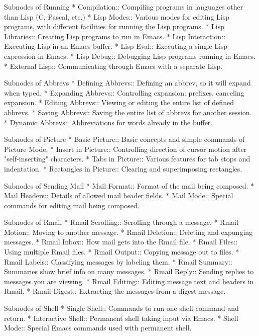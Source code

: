 Subnodes of Running
* Compilation::       Compiling programs in languages other than Lisp
                       (C, Pascal, etc.)
* Lisp Modes::        Various modes for editing Lisp programs, with
                       different facilities for running the Lisp programs.
* Lisp Libraries::    Creating Lisp programs to run in Emacs.
* Lisp Interaction::  Executing Lisp in an Emacs buffer.
* Lisp Eval::         Executing a single Lisp expression in Emacs.
* Lisp Debug::        Debugging Lisp programs running in Emacs.
* External Lisp::     Communicating through Emacs with a separate Lisp.

Subnodes of Abbrevs
* Defining Abbrevs::  Defining an abbrev, so it will expand when typed.
* Expanding Abbrevs:: Controlling expansion: prefixes, canceling expansion.
* Editing Abbrevs::   Viewing or editing the entire list of defined abbrevs.
* Saving Abbrevs::    Saving the entire list of abbrevs for another session.
* Dynamic Abbrevs::   Abbreviations for words already in the buffer.

Subnodes of Picture
* Basic Picture::     Basic concepts and simple commands of Picture Mode.
* Insert in Picture:: Controlling direction of cursor motion
                       after "self-inserting" characters.
* Tabs in Picture::   Various features for tab stops and indentation.
* Rectangles in Picture:: Clearing and superimposing rectangles.

Subnodes of Sending Mail
* Mail Format::       Format of the mail being composed.
* Mail Headers::      Details of allowed mail header fields.
* Mail Mode::         Special commands for editing mail being composed.

Subnodes of Rmail
* Rmail Scrolling::   Scrolling through a message.
* Rmail Motion::      Moving to another message.
* Rmail Deletion::    Deleting and expunging messages.
* Rmail Inbox::       How mail gets into the Rmail file.
* Rmail Files::       Using multiple Rmail files.
* Rmail Output::      Copying message out to files.
* Rmail Labels::      Classifying messages by labeling them.
* Rmail Summary::     Summaries show brief info on many messages.
* Rmail Reply::       Sending replies to messages you are viewing.
* Rmail Editing::     Editing message text and headers in Rmail.
* Rmail Digest::      Extracting the messages from a digest message.

Subnodes of Shell
* Single Shell::      Commands to run one shell command and return.
* Interactive Shell:: Permanent shell taking input via Emacs.
* Shell Mode::        Special Emacs commands used with permanent shell.

